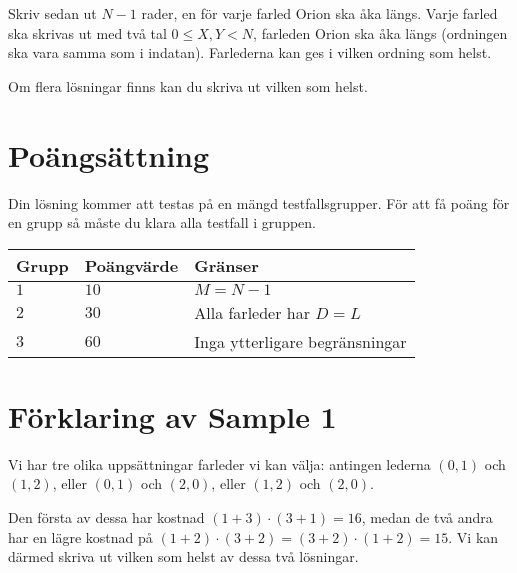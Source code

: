 Skriv sedan ut $N - 1$ rader, en för varje farled Orion ska åka längs.
Varje farled ska skrivas ut med två tal $0 \le X, Y < N$, farleden Orion ska åka längs (ordningen ska vara samma som i indatan).
Farlederna kan ges i vilken ordning som helst.

Om flera lösningar finns kan du skriva ut vilken som helst.

\section*{Poängsättning}
Din lösning kommer att testas på en mängd testfallsgrupper. För att få poäng för en grupp så måste du klara alla testfall i gruppen.

\noindent
\begin{tabular}{| l | l | p{12cm} |}
  \hline
  Grupp & Poängvärde & Gränser \\ \hline
  $1$   & $10$       & $M = N-1$ \\ \hline
  $2$   & $30$       & Alla farleder har $D = L$ \\ \hline
  $3$   & $60$       & Inga ytterligare begränsningar \\ \hline
\end{tabular}

\section*{Förklaring av Sample 1}
Vi har tre olika uppsättningar farleder vi kan välja: antingen lederna $(0, 1)$ och $(1, 2)$, eller $(0, 1)$ och $(2, 0)$, eller $(1, 2)$ och $(2, 0)$.

Den första av dessa har kostnad $(1 + 3) \cdot (3 + 1) = 16$, medan de två andra har en lägre kostnad på $(1 + 2) \cdot (3 + 2) = (3 + 2) \cdot (1 + 2) = 15$.
Vi kan därmed skriva ut vilken som helst av dessa två lösningar.
